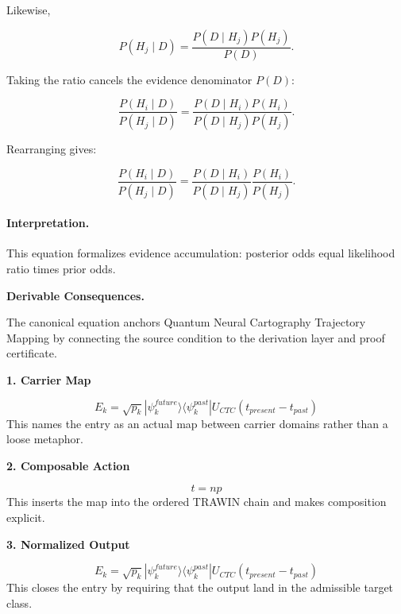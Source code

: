 Likewise,

\begin{equation}
P(H_j\mid D)
=
\frac{P(D\mid H_j)P(H_j)}
{P(D)} .
\end{equation}

Taking the ratio cancels the evidence denominator $P(D)$:

\begin{equation}
\frac{P(H_i\mid D)}
{P(H_j\mid D)}
=
\frac{P(D\mid H_i)P(H_i)}
{P(D\mid H_j)P(H_j)} .
\end{equation}

Rearranging gives:

\begin{equation}
\boxed{
\frac{P(H_i\mid D)}
{P(H_j\mid D)}
=
\frac{P(D\mid H_i)}
{P(D\mid H_j)}
\frac{P(H_i)}
{P(H_j)} .
}
\end{equation}

\paragraph{Interpretation.}
This equation formalizes evidence accumulation: posterior odds equal likelihood ratio times prior odds.

\par\vspace{0.35em}
\noindent\textbf{Derivable Consequences.}\quad
\begingroup
\footnotesize
\raggedright
The canonical equation anchors Quantum Neural Cartography Trajectory Mapping by connecting the source condition to the derivation layer and proof certificate.
\par\endgroup

\noindent\textbf{1. Carrier Map}\par
\[
E_k = \sqrt{p_k} |\psi_k^{future}\rangle \langle \psi_k^{past}| U_{CTC}(t_{present} - t_{past})
\]
\noindent This names the entry as an actual map between carrier domains rather than a loose metaphor.\par
\noindent\textbf{2. Composable Action}\par
\[
t = np
\]
\noindent This inserts the map into the ordered TRAWIN chain and makes composition explicit.\par
\noindent\textbf{3. Normalized Output}\par
\[
E_k = \sqrt{p_k} |\psi_k^{future}\rangle \langle \psi_k^{past}| U_{CTC}(t_{present} - t_{past})
\]
\noindent This closes the entry by requiring that the output land in the admissible target class.\par

